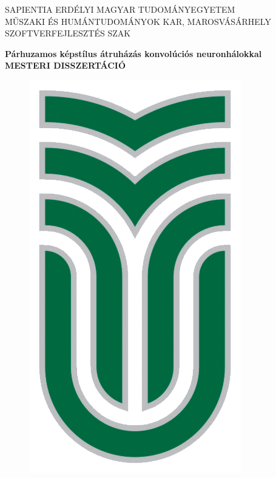 \documentclass[12pt, a4paper, oneside]{book}
\theoremstyle{tetel}
\begin{document}

\newpage
\thispagestyle{empty}
\begin{center}
    \Large SAPIENTIA ERDÉLYI MAGYAR TUDOMÁNYEGYETEM\\
    \Large MŰSZAKI ÉS HUMÁNTUDOMÁNYOK KAR, MAROSVÁSÁRHELY\\
    \Large SZOFTVERFEJLESZTÉS SZAK\\
\end{center}

\begin{center}
 	\vspace{2cm}\LARGE \textbf{Párhuzamos képstílus átruházás konvolúciós neuronhálokkal}\\
	 \vspace{1cm}\LARGE \textbf{MESTERI DISSZERTÁCIÓ}\\
\end{center}

\vspace{2cm}
\begin{figure}[htb]
\begin{center}
\includegraphics{sapientia_logo.png}
\end{center}
\end{figure}
\end{document}
